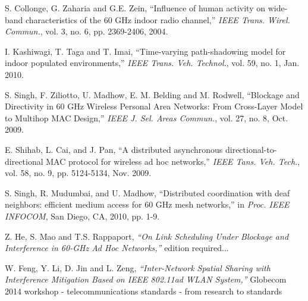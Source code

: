 \documentclass[10pt, conference, letterpaper]{IEEEtran}
\begin{document}
\begin{thebibliography}{50}
S. Collonge, G. Zaharia and G.E. Zein, ``Influence of human activity on wide-band characteristics of the 60 GHz indoor radio channel,'' \emph{IEEE Trans. Wirel. Commun.}, vol. 3,  no. 6, pp. 2369-2406, 2004.

I. Kashiwagi, T. Taga and T. Imai, ``Time-varying path-shadowing model for indoor populated environments,'' \emph{IEEE Trans. Veh. Technol.}, vol. 59, no. 1, Jan. 2010.

S. Singh, F. Ziliotto, U. Madhow, E. M. Belding and M. Rodwell, ``Blockage and Directivity in 60 GHz Wireless Personal Area Networks: From Cross-Layer Model to Multihop MAC Design,'' \emph{IEEE J. Sel. Areas Commun.}, vol. 27, no. 8, Oct. 2009.




E. Shihab, L. Cai, and J. Pan, ``A distributed asynchronous directional-to-directional MAC protocol for wireless ad hoc networks,'' \emph{IEEE Tans. Veh. Tech.}, vol. 58, no. 9, pp. 5124-5134, Nov. 2009. 

S. Singh, R. Mudumbai, and U. Madhow, ``Distributed coordination with deaf neighbors: efficient medium access for 60 GHz mesh networks,'' in \emph{Proc. IEEE INFOCOM}, San Diego, CA, 2010, pp. 1-9.

Z. He, S. Mao and T.S. Rappaport, \emph{``On Link Scheduling Under Blockage and Interference in 60-GHz Ad Hoc Networks,''} edition required...

W. Feng, Y. Li, D. Jin and L. Zeng, \emph{``Inter-Network Spatial Sharing with Interference Mitigation Based on IEEE 802.11ad WLAN System,''} Globecom 2014 workshop - telecommunications standards - from research to standards



\end{thebibliography}
\end{document}
